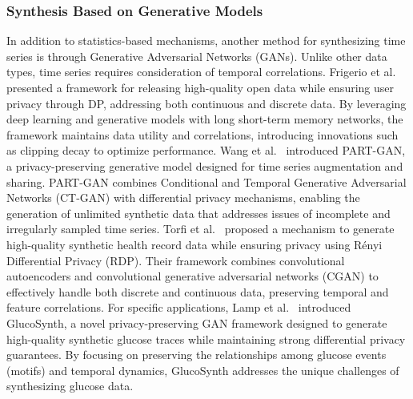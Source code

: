 \subsubsection{Synthesis Based on Generative Models}
In addition to statistics-based mechanisms, another method for synthesizing time series is through Generative Adversarial Networks (GANs). Unlike other data types, time series requires consideration of temporal correlations. 
Frigerio et al.~\cite{frigerio2019differentially} presented a framework for releasing high-quality open data while ensuring user privacy through DP, addressing both continuous and discrete data. By leveraging deep learning and generative models with long short-term memory networks, the framework maintains data utility and correlations, introducing innovations such as clipping decay to optimize performance.
Wang et al.~\cite{wang2020part} introduced PART-GAN, a privacy-preserving generative model designed for time series augmentation and sharing. PART-GAN combines Conditional and Temporal Generative Adversarial Networks (CT-GAN) with differential privacy mechanisms, enabling the generation of unlimited synthetic data that addresses issues of incomplete and irregularly sampled time series.
Torfi et al.~\cite{torfi2022differentially} proposed a mechanism to generate high-quality synthetic health record data while ensuring privacy using R\'enyi Differential Privacy (RDP). Their framework combines convolutional autoencoders and convolutional generative adversarial networks (CGAN) to effectively handle both discrete and continuous data, preserving temporal and feature correlations.
For specific applications, Lamp et al.~\cite{lamp2024glucosynth} introduced GlucoSynth, a novel privacy-preserving GAN framework designed to generate high-quality synthetic glucose traces while maintaining strong differential privacy guarantees. By focusing on preserving the relationships among glucose events (motifs) and temporal dynamics, GlucoSynth addresses the unique challenges of synthesizing glucose data.





